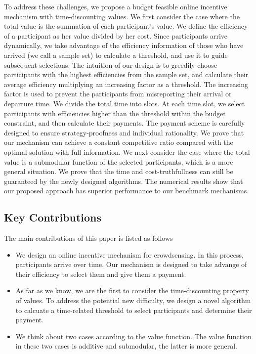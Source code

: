 \documentclass[conference,compsocconf,letterpaper,10pt]{IEEEtran}
\begin{document}
To address these challenges, we propose a budget feasible online incentive mechanism with time-discounting values. We first consider the case where the total value is the summation of each participant's value. We define the efficiency of a participant as her value divided by her cost. Since participants arrive dynamically, we take advantage of the efficiency information of those who have arrived (we call a sample set) to calculate a threshold, and use it to guide subsequent selections. The intuition of our design is to greedily choose participants with the highest efficiencies from the sample set, and calculate their average efficiency multiplying an increasing factor as a threshold. The increasing factor is used to prevent the participants from misreporting their arrival or departure time. We divide the total time into slots. At each time slot, we select participants with efficiencies higher than the threshold within the budget constraint, and then calculate their payments. The payment scheme is carefully designed to ensure strategy-proofness and individual rationality. We prove that our mechanism can achieve a constant competitive ratio compared with the optimal solution with full information. We next consider the case where the total value is a submodular function of the selected participants, which is a more general situation. We prove that the time and cost-truthfullness can still be guaranteed by the newly designed algorithms. The numerical results show that our proposed approach has superior performance to our benchmark mechanisms.
\subsection{Key Contributions}
The main contributions of this paper is listed as follows
\begin{itemize}
\item We design an online incentive mechanism for crowdsensing. In this process, participants arrive over time. Our mechanism is designed to take advange of their efficiency to select them and give them a payment.

\item As far as we know, we are the first to consider the time-discounting property of values. To address the potential new difficulty, we design a novel algorithm to calcuate a time-related threshold to select participants and determine their payment.

\item We think about two cases according to the value function. The value function in these two cases is additive and submodular, the latter is more general.
\end{itemize}
\end{document}
